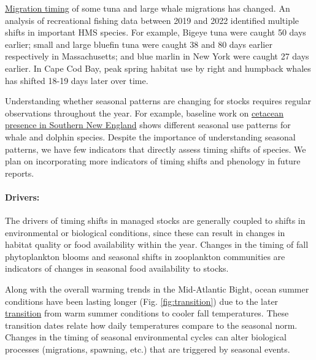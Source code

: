 \documentclass[
  10pt,
]{article}
\begin{document}
\href{https://noaa-edab.github.io/catalog/timing_shifts.html}{Migration timing} of some tuna and large whale migrations has changed. An analysis of recreational fishing data between 2019 and 2022 identified multiple shifts in important HMS species. For example, Bigeye tuna were caught 50 days earlier; small and large bluefin tuna were caught 38 and 80 days earlier respectively in Massachusetts; and blue marlin in New York were caught 27 days earlier. In Cape Cod Bay, peak spring habitat use by right and humpback whales has shifted 18-19 days later over time.

Understanding whether seasonal patterns are changing for stocks requires regular observations throughout the year. For example, baseline work on \href{https://noaa-edab.github.io/catalog/cetacean_acoustic.html}{cetacean presence in Southern New England} shows different seasonal use patterns for whale and dolphin species. Despite the importance of understanding seasonal patterns, we have few indicators that directly assess timing shifts of species. We plan on incorporating more indicators of timing shifts and phenology in future reports.

\paragraph{Drivers:}\label{drivers-1}

The drivers of timing shifts in managed stocks are generally coupled to shifts in environmental or biological conditions, since these can result in changes in habitat quality or food availability within the year. Changes in the timing of fall phytoplankton blooms and seasonal shifts in zooplankton communities are indicators of changes in seasonal food availability to stocks.

Along with the overall warming trends in the Mid-Atlantic Bight, ocean summer conditions have been lasting longer (Fig. \ref{fig:transition}) due to the later \href{https://noaa-edab.github.io/catalog/trans_dates.html}{transition} from warm summer conditions to cooler fall temperatures. These transition dates relate how daily temperatures compare to the seasonal norm. Changes in the timing of seasonal environmental cycles can alter biological processes (migrations, spawning, etc.) that are triggered by seasonal events.
\end{document}
